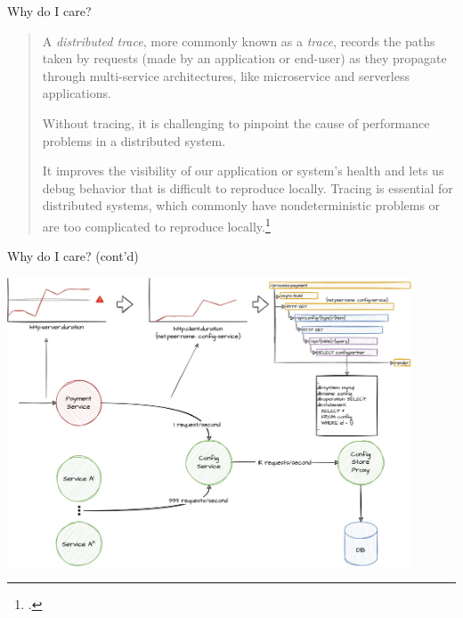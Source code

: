 \documentclass[aspectratio=169]{beamer}
\begin{document}
\begin{frame}{Why do I care?}
  \begin{quote}

    A \emph{distributed trace}, more commonly known as a \emph{trace}, records
    the paths taken by requests (made by an application or end-user) as they
    propagate through multi-service architectures, like microservice and
    serverless applications.

    \vspace{0.618em}

    Without tracing, it is challenging to pinpoint the cause of performance
    problems in a distributed system.

    \vspace{0.618em}

    It improves the visibility of our application or system's health and lets us
    debug behavior that is difficult to reproduce locally. Tracing is essential
    for distributed systems, which commonly have nondeterministic problems or are
    too complicated to reproduce locally.\footcite{otel-dist-trace}

  \end{quote}
\end{frame}

\begin{frame}{Why do I care? (cont'd)}
  \begin{center}
    \includegraphics[width=0.9\textwidth, height=0.9\textheight, keepaspectratio]{distributed-tracing.jpg}
  \end{center}
\end{frame}
\end{document}
